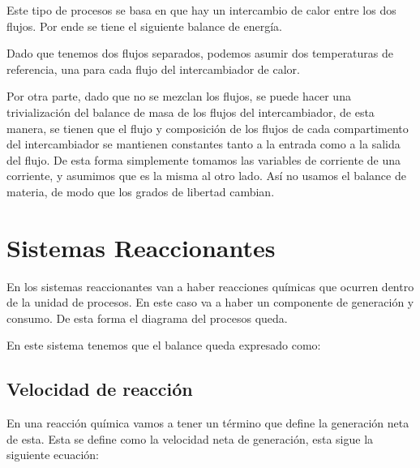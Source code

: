 Este tipo de procesos se basa en que hay un intercambio de calor entre los dos flujos. Por ende se tiene el siguiente balance de energía.


Dado que tenemos dos flujos separados, podemos asumir dos temperaturas de referencia, una para cada flujo del intercambiador de calor. 

Por otra parte, dado que no se mezclan los flujos, se puede hacer una trivialización del balance de masa de los flujos del intercambiador, de esta manera, se tienen que el flujo y composición de los flujos de cada compartimento del intercambiador
se mantienen constantes tanto a la entrada como a la salida del flujo. De esta forma simplemente tomamos las variables de corriente de una corriente, y asumimos que es la misma al otro lado. Así no usamos el balance de materia, de modo que los grados de libertad cambian.

\clearpage

\section{Sistemas Reaccionantes}

En los sistemas reaccionantes van a haber reacciones químicas que ocurren dentro de la unidad de procesos. En este caso va a haber un componente de generación y consumo. De esta forma el diagrama del procesos queda.


En este sistema tenemos que el balance queda expresado como:


\subsection{Velocidad de reacción}

En una reacción química vamos a tener un término que define la generación neta de esta. Esta se define como la velocidad neta de generación, esta sigue la siguiente ecuación:


